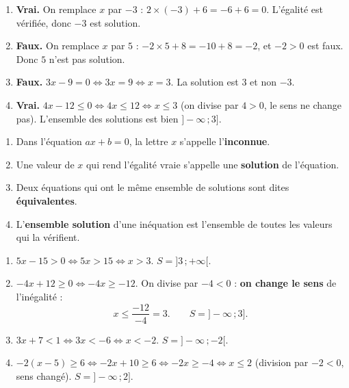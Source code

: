\documentclass[11pt]{article}
\begin{document}
\begin{corrige}
\begin{enumerate}
    \item \textbf{Vrai.} On remplace $x$ par $-3$ : $2\times(-3) + 6 = -6 + 6 = 0$. L'égalité est vérifiée, donc $-3$ est solution.
    \item \textbf{Faux.} On remplace $x$ par $5$ : $-2\times 5 + 8 = -10 + 8 = -2$, et $-2 > 0$ est faux. Donc $5$ n'est pas solution.
    \item \textbf{Faux.} $3x - 9 = 0 \iff 3x = 9 \iff x = 3$. La solution est $3$ et non $-3$.
    \item \textbf{Vrai.} $4x - 12 \leqslant 0 \iff 4x \leqslant 12 \iff x \leqslant 3$ (on divise par $4 > 0$, le sens ne change pas). L'ensemble des solutions est bien $]-\infty\,; 3]$.
\end{enumerate}
\end{corrige}

\begin{corrige}
\begin{enumerate}
    \item Dans l'équation $ax + b = 0$, la lettre $x$ s'appelle l'\textbf{inconnue}.
    \item Une valeur de $x$ qui rend l'égalité vraie s'appelle une \textbf{solution} de l'équation.
    \item Deux équations qui ont le même ensemble de solutions sont dites \textbf{équivalentes}.
    \item L'\textbf{ensemble solution} d'une inéquation est l'ensemble de toutes les valeurs qui la vérifient.
\end{enumerate}
\end{corrige}

\begin{corrige}
\begin{enumerate}
    \item $5x - 15 > 0 \iff 5x > 15 \iff x > 3$. \quad $S = ]3\,; +\infty[$.
    \item $-4x + 12 \geqslant 0 \iff -4x \geqslant -12$. On divise par $-4 < 0$ : \textbf{on change le sens} de l'inégalité :
    \[ x \leqslant \dfrac{-12}{-4} = 3. \qquad S = ]-\infty\,; 3]. \]
    \item $3x + 7 < 1 \iff 3x < -6 \iff x < -2$. \quad $S = ]-\infty\,; -2[$.
    \item $-2(x - 5) \geqslant 6 \iff -2x + 10 \geqslant 6 \iff -2x \geqslant -4 \iff x \leqslant 2$ (division par $-2 < 0$, sens changé). \quad $S = ]-\infty\,; 2]$.
\end{enumerate}
\end{corrige}
\end{document}
